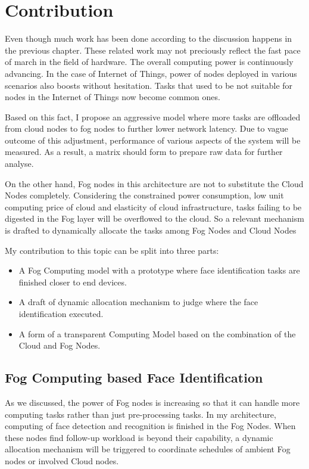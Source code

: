 \chapter{Contribution} \label{chap:contribution}

Even though much work has been done according to the discussion happens in the previous chapter. These related work may not preciously reflect the fast pace of march in the field of hardware. The overall computing power is continuously advancing. In the case of Internet of Things, power of nodes deployed in various scenarios also boosts without hesitation. Tasks that used to be not suitable for nodes in the Internet of Things now become common ones. 

Based on this fact, I propose an aggressive model where more tasks are offloaded from cloud nodes to fog nodes to further lower network latency. Due to vague outcome of this adjustment, performance of various aspects of the system will be measured. As a result, a matrix should form to prepare raw data for further analyse.

On the other hand, Fog nodes in this architecture are not to substitute the Cloud Nodes completely. Considering the constrained power consumption, low unit computing price of cloud and elasticity of cloud infrastructure, tasks failing to be digested in the Fog layer will be overflowed to the cloud. So a relevant mechanism is drafted to dynamically allocate the tasks among Fog Nodes and Cloud Nodes

My contribution to this topic can be split into three parts:
\begin{itemize}
    \item A Fog Computing model with a prototype where face identification tasks are finished closer to end devices.
    \item A draft of dynamic allocation mechanism to judge where the face identification executed.
   \item A form of a transparent Computing Model based on the combination of the Cloud and Fog Nodes.
\end{itemize}

\section{Fog Computing based Face Identification}
As we discussed, the power of Fog nodes is increasing so that it can handle more computing tasks rather than just pre-processing tasks. In my architecture, computing of face detection and recognition is finished in the Fog Nodes. When these nodes find follow-up workload is beyond their capability, a dynamic allocation mechanism will be triggered to coordinate schedules of ambient Fog nodes or involved Cloud nodes. 

